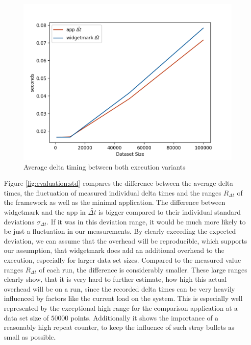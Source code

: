 \begin{figure}[h]
    \centering
    \includegraphics[width=12cm]{resources/img/evaluation/Eval_AVG}
    \caption{Average delta timing between both execution variants}
    \label{fig:evaluation:avg}
\end{figure}

Figure \ref{fig:evaluation:std} compares the difference between the average
delta times, the fluctuation of measured individual delta times and the ranges
$R_{\Delta t}$ of the framework as well as the minimal application. The
difference between widgetmark and the app in $\bar{\Delta t}$ is bigger compared
to their individual standard deviations $\sigma_{\Delta t}$. If it was in this
deviation range, it would be much more likely to be just a fluctuation in our
measurements. By clearly exceeding the expected deviation, we can assume that
the overhead will be reproducible, which supports our assumption, that
widgetmark does add an additional overhead to the execution, especially for
larger data set sizes. Compared to the measured value ranges $R_{\Delta t}$ of
each run, the difference is considerably smaller. These large ranges clearly
show, that it is very hard to further estimate, how high this actual overhead
will be on a run, since the recorded delta times can be very heavily influenced
by factors like the current load on the system. This is especially well
represented by the exceptional high range for the comparison application at
a data set size of $50000$ points. Additionally it shows the importance of a
reasonably high repeat counter, to keep the influence of such stray bullets as
small as possible.


